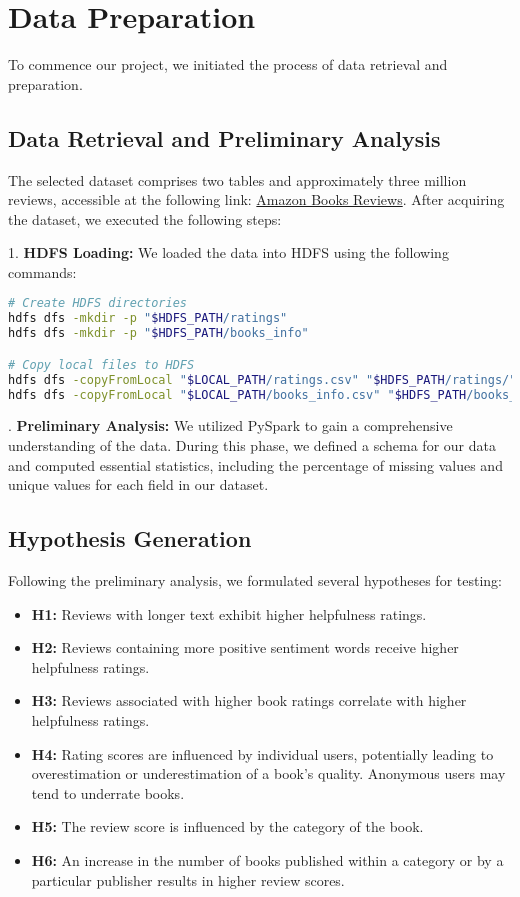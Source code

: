 \section{Data Preparation}
To commence our project, we initiated the process of data retrieval and preparation.

\subsection*{Data Retrieval and Preliminary Analysis}
The selected dataset comprises two tables and approximately three million reviews, accessible at the following link: \href{https://www.kaggle.com/datasets/mohamedbakhet/amazon-books-reviews}{Amazon Books Reviews}.
After acquiring the dataset, we executed the following steps:\\
\noindent

1. \textbf{HDFS Loading:} We loaded the data into HDFS using the following commands:

\begin{lstlisting}[language=bash, frame=single, basicstyle=\footnotesize\ttfamily, breaklines=true]
# Create HDFS directories
hdfs dfs -mkdir -p "$HDFS_PATH/ratings"
hdfs dfs -mkdir -p "$HDFS_PATH/books_info"

# Copy local files to HDFS
hdfs dfs -copyFromLocal "$LOCAL_PATH/ratings.csv" "$HDFS_PATH/ratings/"
hdfs dfs -copyFromLocal "$LOCAL_PATH/books_info.csv" "$HDFS_PATH/books_info/"
\end{lstlisting}

. \textbf{Preliminary Analysis:} We utilized PySpark to gain a comprehensive understanding of the data. During this phase, we defined a schema for our data and computed essential statistics, including the percentage of missing values and unique values for each field in our dataset.

\subsection*{Hypothesis Generation}
Following the preliminary analysis, we formulated several hypotheses for testing:

\begin{itemize}[leftmargin=*, noitemsep]
    \item \textbf{H1:} Reviews with longer text exhibit higher helpfulness ratings.
    \item \textbf{H2:} Reviews containing more positive sentiment words receive higher helpfulness ratings.
    \item \textbf{H3:} Reviews associated with higher book ratings correlate with higher helpfulness ratings.
    \item \textbf{H4:} Rating scores are influenced by individual users, potentially leading to overestimation or underestimation of a book's quality. Anonymous users may tend to underrate books.
    \item \textbf{H5:} The review score is influenced by the category of the book.
    \item \textbf{H6:} An increase in the number of books published within a category or by a particular publisher results in higher review scores.
\end{itemize}

